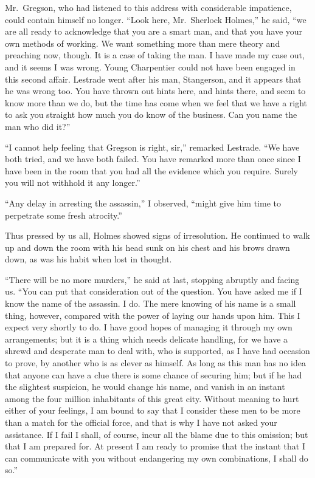 \documentclass[12pt,english]{book}
\begin{document}
Mr.\ Gregson, who had listened to this address with considerable
impatience, could contain himself no longer. {}``Look here, Mr.\ Sherlock
Holmes,'' he said, {}``we are all ready to acknowledge that you
are a smart man, and that you have your own methods of working. We
want something more than mere theory and preaching now, though. It
is a case of taking the man. I have made my case out, and it seems
I was wrong. Young Charpentier could not have been engaged in this
second affair. Lestrade went after his man, Stangerson, and it appears
that he was wrong too. You have thrown out hints here, and hints there,
and seem to know more than we do, but the time has come when we feel
that we have a right to ask you straight how much you do know of the
business. Can you name the man who did it?''

{}``I cannot help feeling that Gregson is right, sir,'' remarked
Lestrade. {}``We have both tried, and we have both failed. You have
remarked more than once since I have been in the room that you had
all the evidence which you require. Surely you will not withhold it
any longer.''

{}``Any delay in arresting the assassin,'' I observed, {}``might
give him time to perpetrate some fresh atrocity.''

Thus pressed by us all, Holmes showed signs of irresolution. He continued
to walk up and down the room with his head sunk on his chest and his
brows drawn down, as was his habit when lost in thought.

{}``There will be no more murders,'' he said at last, stopping abruptly
and facing us. {}``You can put that consideration out of the question.
You have asked me if I know the name of the assassin. I do. The mere
knowing of his name is a small thing, however, compared with the power
of laying our hands upon him. This I expect very shortly to do. I
have good hopes of managing it through my own arrangements; but it
is a thing which needs delicate handling, for we have a shrewd and
desperate man to deal with, who is supported, as I have had occasion
to prove, by another who is as clever as himself. As long as this
man has no idea that anyone can have a clue there is some chance of
securing him; but if he had the slightest suspicion, he would change
his name, and vanish in an instant among the four million inhabitants
of this great city. Without meaning to hurt either of your feelings,
I am bound to say that I consider these men to be more than a match
for the official force, and that is why I have not asked your assistance.
If I fail I shall, of course, incur all the blame due to this omission;
but that I am prepared for. At present I am ready to promise that
the instant that I can communicate with you without endangering my
own combinations, I shall do so.''
\end{document}
